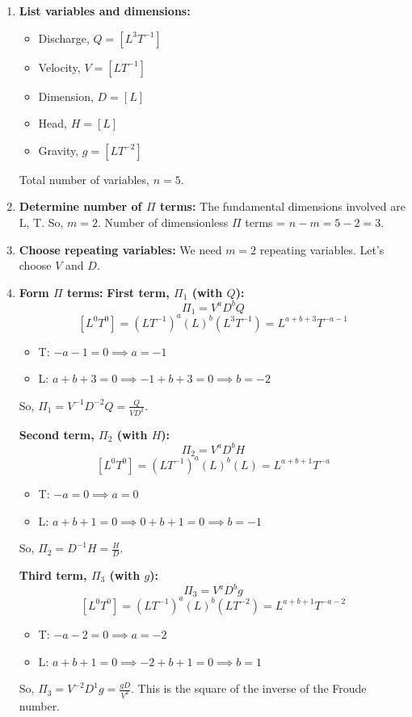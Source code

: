 \documentclass{article}
\begin{document}
\begin{enumerate}
    \item \textbf{List variables and dimensions:}
    \begin{itemize}
        \item Discharge, $Q = [L^3T^{-1}]$
        \item Velocity, $V = [LT^{-1}]$
        \item Dimension, $D = [L]$
        \item Head, $H = [L]$
        \item Gravity, $g = [LT^{-2}]$
    \end{itemize}
    Total number of variables, $n=5$.
    
    \item \textbf{Determine number of $\Pi$ terms:}
    The fundamental dimensions involved are L, T. So, $m=2$.
    Number of dimensionless $\Pi$ terms = $n-m = 5-2 = 3$.
    
    \item \textbf{Choose repeating variables:}
    We need $m=2$ repeating variables. Let's choose $V$ and $D$.
    
    \item \textbf{Form $\Pi$ terms:}
    \textbf{First term, $\Pi_1$ (with $Q$):}
    $$ \Pi_1 = V^a D^b Q $$
    $$ [L^0T^0] = (LT^{-1})^a (L)^b (L^3T^{-1}) = L^{a+b+3} T^{-a-1} $$
    \begin{itemize}
        \item T: $-a-1 = 0 \implies a = -1$
        \item L: $a+b+3 = 0 \implies -1+b+3 = 0 \implies b = -2$
    \end{itemize}
    So, $\Pi_1 = V^{-1} D^{-2} Q = \frac{Q}{VD^2}$.
    
    \textbf{Second term, $\Pi_2$ (with $H$):}
    $$ \Pi_2 = V^a D^b H $$
    $$ [L^0T^0] = (LT^{-1})^a (L)^b (L) = L^{a+b+1} T^{-a} $$
    \begin{itemize}
        \item T: $-a = 0 \implies a = 0$
        \item L: $a+b+1 = 0 \implies 0+b+1 = 0 \implies b = -1$
    \end{itemize}
    So, $\Pi_2 = D^{-1} H = \frac{H}{D}$.
    
    \textbf{Third term, $\Pi_3$ (with $g$):}
    $$ \Pi_3 = V^a D^b g $$
    $$ [L^0T^0] = (LT^{-1})^a (L)^b (LT^{-2}) = L^{a+b+1} T^{-a-2} $$
    \begin{itemize}
        \item T: $-a-2 = 0 \implies a = -2$
        \item L: $a+b+1 = 0 \implies -2+b+1 = 0 \implies b = 1$
    \end{itemize}
    So, $\Pi_3 = V^{-2} D^{1} g = \frac{gD}{V^2}$. This is the square of the inverse of the Froude number.


\end{enumerate}
\end{document}
